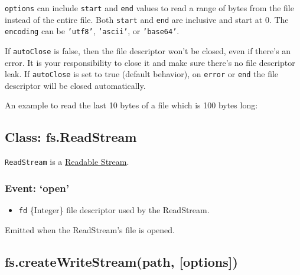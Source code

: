 \texttt{options} can include \texttt{start} and \texttt{end} values to
read a range of bytes from the file instead of the entire file. Both
\texttt{start} and \texttt{end} are inclusive and start at 0. The
\texttt{encoding} can be \texttt{'utf8'}, \texttt{'ascii'}, or
\texttt{'base64'}.

If \texttt{autoClose} is false, then the file descriptor won't be
closed, even if there's an error. It is your responsibility to close it
and make sure there's no file descriptor leak. If \texttt{autoClose} is
set to true (default behavior), on \texttt{error} or \texttt{end} the
file descriptor will be closed automatically.

An example to read the last 10 bytes of a file which is 100 bytes long:

\begin{Shaded}
\begin{Highlighting}[]
\NormalTok{(}\NormalTok{, \{}\NormalTok{: }\NormalTok{, }\NormalTok{: }\NormalTok{\});}
\end{Highlighting}
\end{Shaded}

\subsection{Class: fs.ReadStream}\label{class-fs.readstream}

\texttt{ReadStream} is a
\href{stream.html\#stream_class_stream_readable}{Readable Stream}.

\subsubsection{Event: `open'}\label{event-open}

\begin{itemize}
\itemsep1pt\parskip0pt
\item
  \texttt{fd} \{Integer\} file descriptor used by the ReadStream.
\end{itemize}

Emitted when the ReadStream's file is opened.

\subsection{fs.createWriteStream(path,
{[}options{]})}\label{fs.createwritestreampath-options}

